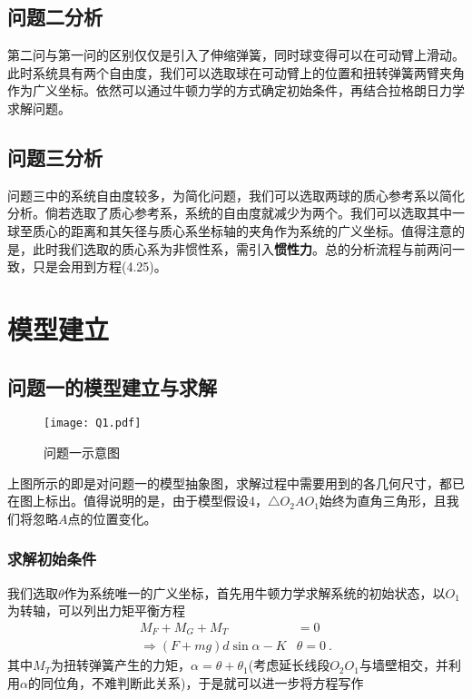 \documentclass[a4paper,c5size,twoside,UTF8]{ctexart} %
\numberwithin{equation}{section}   %
\begin{document}
\subsection{问题二分析}


第二问与第一问的区别仅仅是引入了伸缩弹簧，同时球变得可以在可动臂上滑动。此时系统具有两个自由度，我们可以选取球在可动臂上的位置和扭转弹簧两臂夹角作为广义坐标。依然可以通过牛顿力学的方式确定初始条件，再结合拉格朗日力学求解问题。

\subsection{问题三分析}

问题三中的系统自由度较多，为简化问题，我们可以选取两球的质心参考系以简化分析。倘若选取了质心参考系，系统的自由度就减少为两个。我们可以选取其中一球至质心的距离和其矢径与质心系坐标轴的夹角作为系统的广义坐标。值得注意的是，此时我们选取的质心系为非惯性系，需引入\textbf{惯性力}。总的分析流程与前两问一致，只是会用到方程(4.25)。

\newpage

\section{模型建立}

\subsection{问题一的模型建立与求解}

\begin{figure}[H]
	\centering
	\texttt{[image: Q1.pdf]}
	\caption{问题一示意图}
\end{figure}




上图所示的即是对问题一的模型抽象图，求解过程中需要用到的各几何尺寸，都已在图上标出。值得说明的是，由于模型假设4，$\triangle O_2 A O_1$始终为直角三角形，且我们将忽略$A$点的位置变化。

\subsubsection{求解初始条件}

我们选取$\theta$作为系统唯一的广义坐标，首先用牛顿力学求解系统的初始状态，以$O_1$为转轴，可以列出力矩平衡方程
\begin{equation}
    \begin{aligned}
        M_F+M_G+M_T&=0\\
        \Rightarrow (F+mg)d \sin\alpha-K&\theta=0~.
    \end{aligned}
\end{equation}
其中$M_T$为扭转弹簧产生的力矩，$\alpha=\theta+\theta_1$(考虑延长线段$O_2O_1$与墙壁相交，并利用$\alpha$的同位角，不难判断此关系)，于是就可以进一步将方程写作
\end{document}
